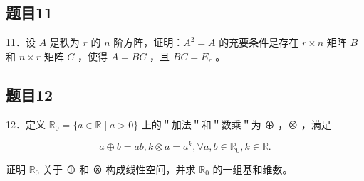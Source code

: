 \documentclass{article}
\begin{document}
\subsection{题目11}
11．设 \(A\) 是秩为 \(r\) 的 \(n\) 阶方阵，证明：\(A^{2}=A\) 的充要条件是存在 \(r \times n\) 矩阵 \(B\) 和 \(n \times r\) 矩阵 \(C\) ，使得 \(A=B C\) ，且 \(B C=E_{r}\) 。

\subsection{题目12}
12．定义 \(\mathbb{R}_{0}=\{a \in \mathbb{R} \mid a>0\}\) 上的＂加法＂和＂数乘＂为 ⊕ ，⊗ ，满足

\[
a \oplus b=a b, k \otimes a=a^{k}, \forall a, b \in \mathbb{R}_{0}, k \in \mathbb{R} .
\]

证明 \(\mathbb{R}_{0}\) 关于 ⊕ 和 ⊗ 构成线性空间，并求 \(\mathbb{R}_{0}\) 的一组基和维数。
\end{document}
